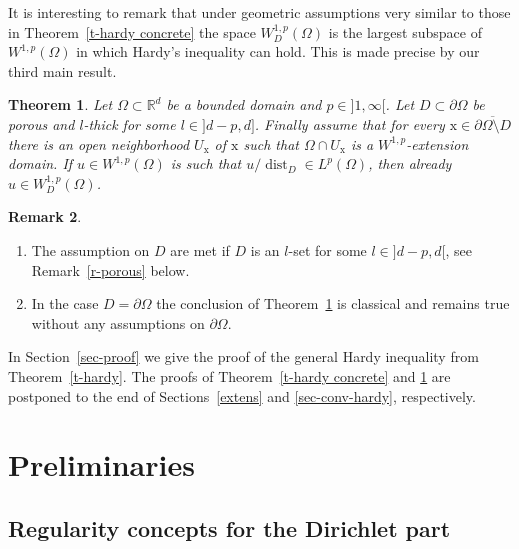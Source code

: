 \documentclass[10pt,leqno]{amsart}
\newtheorem{theorem}{Theorem}[section]
\theoremstyle{definition}
\newtheorem{remark}[theorem]{Remark}
\numberwithin{equation}{section}
\begin{document}
It is interesting to remark that under geometric assumptions very similar to
those in
Theorem~\ref{t-hardy concrete} the space $W_D^{1,p}(\Omega)$ is the largest
subspace of $W^{1,p}(\Omega)$ in which Hardy's inequality can hold. This is
made precise by our third main result.

\begin{theorem} \label{t-converse hardy}
Let $\Omega \subset {{\mathbb R}}^d$ be a bounded domain and $p \in {]1,\infty[}$. Let $D
\subset \partial \Omega$ be porous and $l$-thick for some $l \in {]d-p,d]}$.
Finally assume that for every ${{\mathrm x}} \in \overline{\partial\Omega \setminus D}$
there is an open neighborhood $U_{{\mathrm x}}$ of ${{\mathrm x}}$ such that $\Omega \cap U_\mathrm x$
is a $W^{1,p}$-extension domain. If $u \in W^{1,p}(\Omega)$ is such that
$u/{\operatorname{dist}}_D \in L^p(\Omega)$, then already $u \in W_D^{1,p}(\Omega)$.
\end{theorem}

\begin{remark} \label{r-converse hardy}
\begin{enumerate}
 \item The assumption on $D$ are met if $D$ is an $l$-set for some $l \in
{]d-p,d[}$, see Remark~\ref{r-porous} below. 
 \item In the case $D = \partial \Omega$ the conclusion of
 Theorem~\ref{t-converse hardy} is classical \cite[Thm.~V.3.4]{ed/ev} and
 remains true without any assumptions on $\partial \Omega$.
\end{enumerate}
\end{remark}

In Section~\ref{sec-proof} we give the proof of the general Hardy inequality
from Theorem~\ref{t-hardy}. The proofs of Theorem~\ref{t-hardy concrete} and
\ref{t-converse hardy} are postponed to the end of Sections~\ref{extens} and
\ref{sec-conv-hardy}, respectively.

\section{Preliminaries} \label{sec-preliminaries}
\subsection{Regularity concepts for the Dirichlet part}\label{subsec-concepts
for D}
\end{document}
